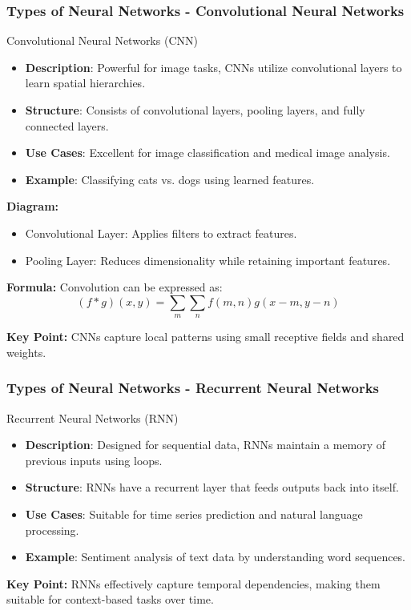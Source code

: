 \documentclass[aspectratio=169]{beamer}
\begin{document}
\begin{frame}[fragile]
    \frametitle{Types of Neural Networks - Convolutional Neural Networks}
    \begin{block}{Convolutional Neural Networks (CNN)}
        \begin{itemize}
            \item \textbf{Description}: Powerful for image tasks, CNNs utilize convolutional layers to learn spatial hierarchies.
            \item \textbf{Structure}: Consists of convolutional layers, pooling layers, and fully connected layers.
            \item \textbf{Use Cases}: Excellent for image classification and medical image analysis.
            \item \textbf{Example}: Classifying cats vs. dogs using learned features.
        \end{itemize}
        
        \textbf{Diagram:}
        \begin{itemize}
            \item Convolutional Layer: Applies filters to extract features.
            \item Pooling Layer: Reduces dimensionality while retaining important features.
        \end{itemize}

        \textbf{Formula:} Convolution can be expressed as:
        \begin{equation}
            (f*g)(x,y) = \sum_m \sum_n f(m,n)g(x-m,y-n)
        \end{equation}

        \textbf{Key Point:} CNNs capture local patterns using small receptive fields and shared weights.
    \end{block}
\end{frame}

\begin{frame}[fragile]
    \frametitle{Types of Neural Networks - Recurrent Neural Networks}
    \begin{block}{Recurrent Neural Networks (RNN)}
        \begin{itemize}
            \item \textbf{Description}: Designed for sequential data, RNNs maintain a memory of previous inputs using loops.
            \item \textbf{Structure}: RNNs have a recurrent layer that feeds outputs back into itself.
            \item \textbf{Use Cases}: Suitable for time series prediction and natural language processing.
            \item \textbf{Example}: Sentiment analysis of text data by understanding word sequences.
        \end{itemize}
        
        \textbf{Key Point:} RNNs effectively capture temporal dependencies, making them suitable for context-based tasks over time.
    \end{block}
\end{frame}
\end{document}
